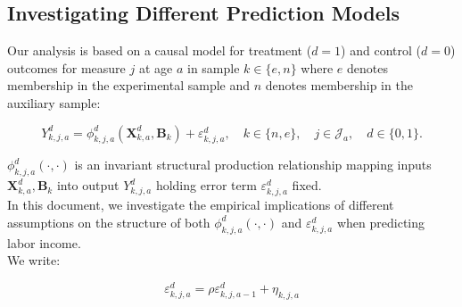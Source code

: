 


\usepackage[stable]{footmisc}

\newcommand*\leftright[2]{%
  \leavevmode
  \rlap{#1}%
  \hspace{0.5\linewidth}%
  #2}

\newcommand{\orth}{\ensuremath{\perp\!\!\!\perp}}%
\newcommand{\indep}{\orth}%
\newcommand{\notorth}{\ensuremath{\perp\!\!\!\!\!\!\diagup\!\!\!\!\!\!\perp}}%
\newcommand{\notindep}{\notorth}







\doublespacing

\subsection{Investigating Different Prediction Models} \label{appendix:predsensitivity}

\noindent Our analysis is based on a causal model for treatment ($d=1$) and control ($d=0$) outcomes for measure $j$ at age $a$ in sample $k \in \{e,n\}$ where $e$ denotes membership in the experimental sample and $n$ denotes membership in the auxiliary sample:

\begin{equation}\label{eq:outcome}
Y^d_{k,j,a} = \phi^d_{k,j,a} (\bm{X}^d_{k,a}, \bm{B}_k) + \varepsilon^d_{k,j,a}, \quad k \in \{n,e\}, \quad j \in \mathcal{J}_a, \quad d \in \{0, 1\}.
\end{equation}

\noindent $\phi^d_{k,j,a}\left( \cdot, \cdot \right)$ is an invariant structural production relationship mapping inputs $\bm{X}^d_{k,a}, \bm{B}_k$ into output $Y^d_{k,j,a}$ holding error term $\varepsilon^d_{k,j,a}$ fixed.\\ 

\noindent In this document, we investigate the empirical implications of different assumptions on the structure of both $\phi_{k,j,a}^d \left( \cdot, \cdot \right)$ and $\varepsilon_{k,j,a}^d$ when predicting labor income.\\ 

\noindent We write: 

\begin{equation}
\varepsilon^d_{k,j,a} = \rho \varepsilon^d_{k,j,{a-1}} + \eta_{k,j,{a}} \label{eq:error}
\end{equation}

